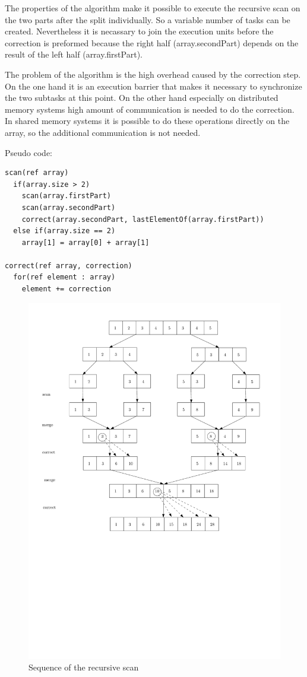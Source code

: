 \documentclass[a4paper,twoside,11pt]{article}
\begin{document}
The properties of the algorithm make it possible to execute the recursive scan on the two parts after the split individually. So a variable number of tasks can be created. Nevertheless it is necassary to join the execution units before the correction is preformed because the right half (array.secondPart) depends on the result of the left half (array.firstPart). 

The problem of the algorithm is the high overhead caused by the correction step. On the one hand it is an execution barrier that makes it necessary to synchronize the two subtasks at this point. On the other hand especially on distributed memory systems high amount of communication is needed to do the correction. In shared memory systems it is possible to do these operations directly on the array, so the additional communication is not needed.

Pseudo code:
\begin{verbatim}
scan(ref array)
  if(array.size > 2)
    scan(array.firstPart)
    scan(array.secondPart)
    correct(array.secondPart, lastElementOf(array.firstPart))
  else if(array.size == 2)
    array[1] = array[0] + array[1]
	
correct(ref array, correction)
  for(ref element : array)
    element += correction
\end{verbatim}

\begin{figure}[hbtp]
\centering
\label{fig:para_algo}
\includegraphics[scale=.75]{recur3}
\caption{Sequence of the recursive scan}
\end{figure}
\end{document}
